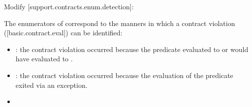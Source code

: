 Modify [support.contracts.enum.detection]:

\begin{adjustwidth}{0.5cm}{0.5cm}
The enumerators of  correspond to the manners in which a contract violation ([basic.contract.eval]) can be identified:
\begin{itemize}
\item {}: the contract violation occurred because the predicate evaluated to  or would have evaluated to .
\item {}: the contract violation occurred because the evaluation of the predicate exited via an exception.
\item {}
\end{itemize}
\end{adjustwidth}




\renewcommand{\addcontentsline}[3]{}%






